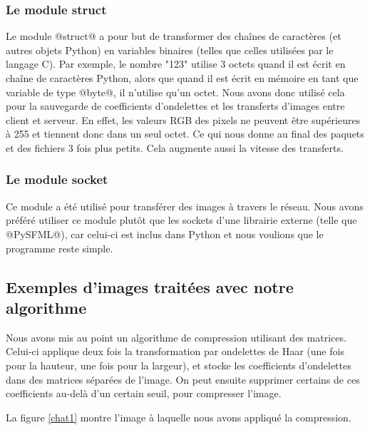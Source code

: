 \documentclass{article}
\begin{document}
\subsubsection{Le module struct}

Le module @struct@ a pour but de transformer des chaînes de caractères (et autres objets Python) en variables binaires (telles que celles utilisées par le langage C). Par exemple, le nombre "123" utilise 3 octets quand il est écrit en chaîne de caractères Python, alors que quand il est écrit en mémoire en tant que variable de type @byte@, il n'utilise qu'un octet. Nous avons donc utilisé cela pour la sauvegarde de coefficients d'ondelettes et les transferts d'images entre client et serveur. En effet, les valeurs RGB des pixels ne peuvent être supérieures à 255 et tiennent donc dans un seul octet. Ce qui nous donne au final des paquets et des fichiers 3 fois plus petits. Cela augmente aussi la vitesse des transferts.


\subsubsection{Le module socket}

Ce module a été utilisé pour transférer des images à travers le réseau. Nous avons préféré utiliser ce module plutôt que les sockets d'une librairie externe (telle que @PySFML@), car celui-ci est inclus dans Python et nous voulions que le programme reste simple.

\subsection{Exemples d'images traitées avec notre algorithme}

Nous avons mis au point un algorithme de compression utilisant des matrices. Celui-ci applique deux fois la transformation par ondelettes de Haar (une fois pour la hauteur, une fois pour la largeur), et stocke les coefficients d'ondelettes dans des matrices séparées de l'image. On peut ensuite supprimer certains de ces coefficients au-delà d'un certain seuil, pour compresser l'image.

La figure \ref{chat1} montre l'image à laquelle nous avons appliqué la compression.
\end{document}
